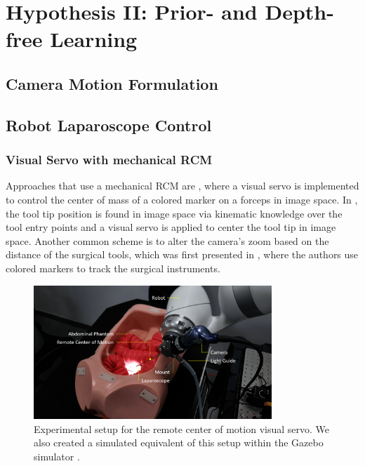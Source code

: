 \section{Hypothesis II: Prior- and Depth-free Learning}
\subsection{Camera Motion Formulation}
\subsection{Robot Laparoscope Control}
\subsubsection{Visual Servo with mechanical RCM}
Approaches that use a mechanical RCM are \cite{omote1999self}, where a visual servo is implemented to control the center of mass of a colored marker on a forceps in image space. In \cite{agustinos2014visual, voros2007automatic}, the tool tip position is found in image space via kinematic knowledge over the tool entry points and a visual servo is applied to center the tool tip in image space. Another common scheme is to alter the camera's zoom based on the distance of the surgical tools, which was first presented in \cite{king2013towards}, where the authors use colored markers to track the surgical instruments.

\begin{figure}
	\centering
	\includegraphics[width=0.8\textwidth]{introduction/img/compresspng/labeled_setup_color_correct.png}
	\caption{Experimental setup for the remote center of motion visual servo. We also created a simulated equivalent of this setup within the Gazebo simulator \cite{koenig2004design}.}
	\label{in:fig:experimental_setup}
\end{figure}

